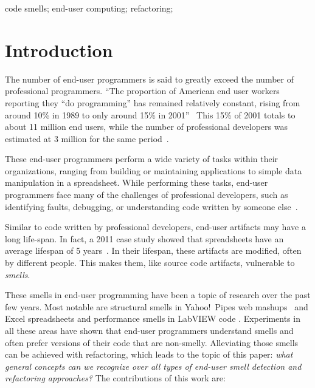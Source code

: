 \documentclass[10pt,conference,compsocconf]{IEEEtran}
\begin{document}
\begin{IEEEkeywords}
code smells;
end-user computing;
refactoring;
\end{IEEEkeywords}

\section{Introduction}
The number of end-user programmers is said to greatly exceed the number of professional programmers. ``The proportion of American end user workers reporting they ``do programming'' has remained relatively constant, rising from around 10\% in 1989 to only around 15\% in 2001''~\cite{Scaf2005} This 15\% of 2001 totals to about 11 million end users, while the number of professional developers was estimated at 3 million for the same period~\cite{Scaf2005}.

These end-user programmers perform a wide variety of tasks within their organizations, ranging from building or maintaining applications to simple data manipulation in a spreadsheet. While performing these tasks, end-user programmers face many of the challenges of professional developers, such as identifying faults, debugging, or understanding code written by someone else~\cite{Ko2011}.

Similar to code written by professional developers, end-user artifacts may have a long life-span.
In fact, a 2011 case study showed that spreadsheets have an average lifespan of 5 years~\cite{Hermans2011}.
In their lifespan, these artifacts are modified, often by different people.
This makes them, like source code artifacts, vulnerable to \emph{smells}. 

These smells in end-user programming have been a topic of research over the past few years. Most notable are structural smells in Yahoo!\ Pipes web mashups~\cite{Stolee2011} and  Excel spreadsheets \cite{Hermans2012inter} and performance smells in LabVIEW code \cite{chambers2013smell}.
Experiments in all these areas have shown that end-user programmers understand smells and often prefer versions of their code that are non-smelly.
Alleviating those smells can be achieved with refactoring, which leads to the topic of this paper: \emph{what general concepts can we recognize over all types of end-user smell detection and refactoring approaches?}
The contributions of this work are:
\end{document}
